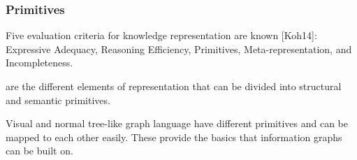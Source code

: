 \begin{frame}
  \frametitle{Primitives}
  \begin{module}[id=primitives]
Five evaluation criteria for knowledge representation are known [Koh14]: Expressive Adequacy, Reasoning Efficiency, Primitives, Meta-representation, and Incompleteness. 

\begin{definition}
   are the different elements of representation that can be divided into structural and semantic primitives.
\end{definition}
 
Visual and normal tree-like graph language have different primitives and can be mapped to each other easily. These provide the basics that information graphs can be built on.\\
  \end{module}
\end{frame}
